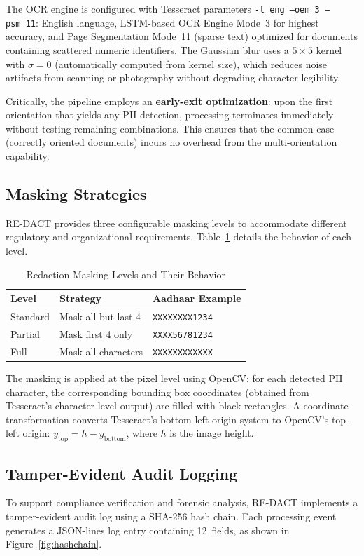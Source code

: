 \documentclass[conference]{IEEEtran}
\begin{document}
The OCR engine is configured with Tesseract parameters \texttt{-l~eng --oem~3 --psm~11}: English language, LSTM-based OCR Engine Mode~3 for highest accuracy, and Page Segmentation Mode~11 (sparse text) optimized for documents containing scattered numeric identifiers. The Gaussian blur uses a $5\times5$ kernel with $\sigma=0$ (automatically computed from kernel size), which reduces noise artifacts from scanning or photography without degrading character legibility.

Critically, the pipeline employs an \textbf{early-exit optimization}: upon the first orientation that yields any PII detection, processing terminates immediately without testing remaining combinations. This ensures that the common case (correctly oriented documents) incurs no overhead from the multi-orientation capability.

\subsection{Masking Strategies}
RE-DACT provides three configurable masking levels to accommodate different regulatory and organizational requirements. Table~\ref{tab:masking_levels} details the behavior of each level.

\begin{table}[htbp]
\caption{Redaction Masking Levels and Their Behavior}
\label{tab:masking_levels}
\centering
\begin{tabular}{@{}llp{2.6cm}@{}}
\toprule
\textbf{Level} & \textbf{Strategy} & \textbf{Aadhaar Example} \\
\midrule
Standard & Mask all but last 4 & \texttt{XXXXXXXX1234} \\
Partial  & Mask first 4 only   & \texttt{XXXX56781234} \\
Full     & Mask all characters  & \texttt{XXXXXXXXXXXX} \\
\bottomrule
\end{tabular}
\end{table}

The masking is applied at the pixel level using OpenCV: for each detected PII character, the corresponding bounding box coordinates (obtained from Tesseract's character-level output) are filled with black rectangles. A coordinate transformation converts Tesseract's bottom-left origin system to OpenCV's top-left origin: $y_{\text{top}} = h - y_{\text{bottom}}$, where $h$ is the image height.

\subsection{Tamper-Evident Audit Logging}
To support compliance verification and forensic analysis, RE-DACT implements a tamper-evident audit log using a SHA-256 hash chain. Each processing event generates a JSON-lines log entry containing 12~fields, as shown in Figure~\ref{fig:hashchain}.
\end{document}
